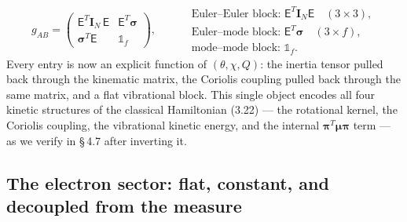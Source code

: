 \begin{equation}
\boxed{\;
g_{AB}=
\begin{pmatrix}
\mathsf E^{T}\mathbf I_N\,\mathsf E & \mathsf E^{T}\boldsymbol\sigma\\[3pt]
\boldsymbol\sigma^{T}\mathsf E & \mathbb 1_f
\end{pmatrix},\qquad
\begin{aligned}
&\text{Euler--Euler block: }\mathsf E^{T}\mathbf I_N\mathsf E\quad(3\times3),\\
&\text{Euler--mode block: }\mathsf E^{T}\boldsymbol\sigma\quad(3\times f),\\
&\text{mode--mode block: }\mathbb 1_f .
\end{aligned}\;}\tag{4.15}
\end{equation}
Every entry is now an explicit function of $(\theta,\chi,Q)$: the inertia tensor pulled back through the kinematic matrix, the Coriolis coupling pulled back through the same matrix, and a flat vibrational block. This single object encodes all four kinetic structures of the classical Hamiltonian (3.22) --- the rotational kernel, the Coriolis coupling, the vibrational kinetic energy, and the internal $\boldsymbol\pi^{T}\boldsymbol\mu\boldsymbol\pi$ term --- as we verify in \S\,4.7 after inverting it.

\subsection{The electron sector: flat, constant, and decoupled from the measure}

